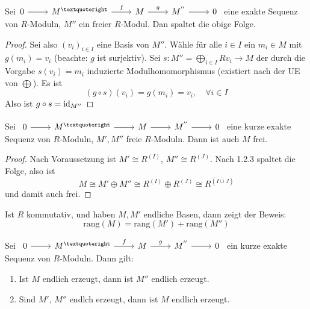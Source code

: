 \begin{sa}
	Sei$\begin{tikzcd}
	0  \arrow{r} & M^{’} \arrow{r}{f} & M \arrow{r}{g} & M^{''} \arrow{r} & 0
	\end{tikzcd} $ eine exakte Sequenz von $R$-Moduln, $M''$ ein freier $R$-Modul. Dan spaltet die obige Folge.
\end{sa}
\begin{proof}
	Sei also $(v_i)_{i\in I}$ eine Basis von $M''$. Wähle für alle $i\in I$ ein $m_i\in M$ mit $g(m_i) = v_i$ (beachte: $g$ ist surjektiv). Sei $s:M'' = \bigoplus_{i\in I} Rv_i \to M$ der durch die Vorgabe $s(v_i) = m_i$ induzierte Modulhomomorphismus (existiert nach der UE von $\bigoplus$). Es ist 
	$$(g\circ s) (v_i) = g(m_i) = v_i, \quad \forall i\in I$$
	Also ist $g\circ s = \operatorname{\text{id}}_{M''}$
\end{proof}
\begin{fo}
	Sei $\begin{tikzcd}
	0  \arrow{r} & M^{’} \arrow{r} & M \arrow{r} & M^{''} \arrow{r} & 0
	\end{tikzcd} $ eine kurze exakte Sequenz von $R$-Moduln, $M', M''$ freie $R$-Moduln. Dann ist auch $M$ frei.
\end{fo}
\begin{proof}
	Nach Voraussetzung ist $M' \cong R^{(I)}$, $M'' \cong R^{(J)}$. Nach 1.2.3 spaltet die Folge, also ist 
	$$M  \cong M'\oplus M'' \cong R^{(I)} \oplus R^{(J)} \cong R^{(I \overset{\cdot}{\cup} J)}$$ und damit auch frei.
\end{proof}
\begin{anm}
	Ist $R$ kommutativ, und haben $M,M'$ endliche Basen, dann zeigt der Beweis: 
	$$\text{rang}(M) = \text{rang}(M') + \text{rang}(M'')$$
\end{anm}
\begin{bem}
	Sei $\begin{tikzcd}
	0  \arrow{r} & M^{’} \arrow{r}{f} & M \arrow{r}{g} & M^{''} \arrow{r} & 0
	\end{tikzcd} $ ein kurze exakte Sequenz von $R$-Moduln. Dann gilt: 
	\begin{enumerate}[label= \alph*)]
		\item Ist $M$ endlich erzeugt, dann ist $M''$ endlich erzeugt.
		\item Sind $M', \, M''$ endlch erzeugt, dann ist $M$ endlich erzeugt.
	\end{enumerate}
\end{bem}
